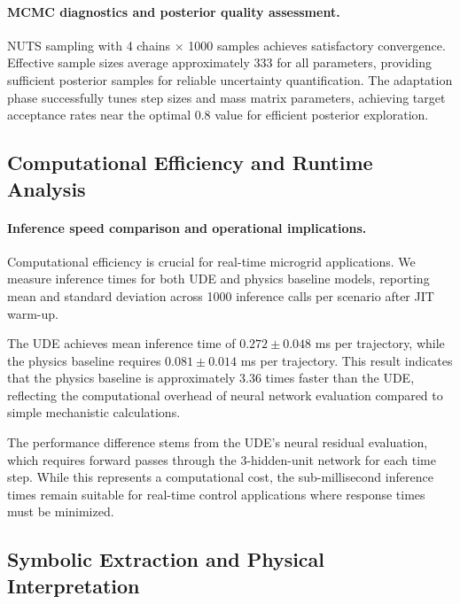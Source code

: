 \paragraph{MCMC diagnostics and posterior quality assessment.} NUTS sampling with 4 chains $\times$ 1000 samples achieves satisfactory convergence. Effective sample sizes average approximately 333 for all parameters, providing sufficient posterior samples for reliable uncertainty quantification. The adaptation phase successfully tunes step sizes and mass matrix parameters, achieving target acceptance rates near the optimal 0.8 value for efficient posterior exploration. %

\subsection{Computational Efficiency and Runtime Analysis}

\paragraph{Inference speed comparison and operational implications.} Computational efficiency is crucial for real-time microgrid applications. We measure inference times for both UDE and physics baseline models, reporting mean and standard deviation across 1000 inference calls per scenario after JIT warm-up.

The UDE achieves mean inference time of $0.272 \pm 0.048$ ms per trajectory, while the physics baseline requires $0.081 \pm 0.014$ ms per trajectory. This result indicates that the physics baseline is approximately 3.36 times faster than the UDE, reflecting the computational overhead of neural network evaluation compared to simple mechanistic calculations. %

The performance difference stems from the UDE's neural residual evaluation, which requires forward passes through the 3-hidden-unit network for each time step. While this represents a computational cost, the sub-millisecond inference times remain suitable for real-time control applications where response times must be minimized. %

\subsection{Symbolic Extraction and Physical Interpretation}

